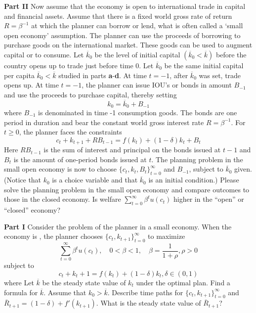 \medskip\noindent
{\bf Part  II}
\medskip \noindent
Now assume that the economy is open to international trade in capital and financial assets. Assume that there is a fixed world gross rate of return $R=\beta^{-1}$ at which the planner can borrow or lend, what is often called a `small open economy' assumption.
The planner can use the proceeds of borrowing to purchase goods on the international market. These goods can be used to augment capital or to consume.\medskip \noindent
Let $\overline{k}_0$ be the level of initial capital $(\overline{k}_0<\overline{k})$ before the country opens up to trade just before time 0.  Let $\overline{k}_0$ be the same initial capital per capita $\overline{k}_0 < \overline{k}$ studied in parts {\bf a}-{\bf d}.\medskip \noindent
At time $t=-1$, after $\overline{k}_0$ was set, trade opens up. At time $t=-1$, the planner can issue IOU's or bonds in amount $B_{-1}$ and use the proceeds to purchase capital, thereby setting
$$k_0=\overline{k}_0+B_{-1} $$
where $B_{-1}$ is denominated in time -1 consumption goods. The bonds are one period in duration and bear the constant world gross interest rate $R=\beta^{-1}$.
For $t\geq 0$, the planner faces the constraints
$$ c_t+k_{t+1}+RB_{t-1}=f(k_t)+(1-\delta)k_t+B_t$$
Here $RB_{t-1}$ is the sum of interest and  principal on the bonds issued at $t-1$ and $B_t$ is the amount of one-period bonds issued at $t$. \medskip \noindent
The planning problem in the small open economy is now to choose $\{c_t,k_{t},B_t\}_{t=0}^\infty$ and $B_{-1}$, subject to $\overline{k}_0$ given. (Notice that $k_0$ is a choice variable and that $\overline{k}_0$ is an initial condition.)
Please solve the  planning problem in the small open economy and compare outcomes to those in the closed economy.
 Is  welfare $\sum_{t=0}^\infty \beta^t u(c_t)$ higher in the ``open'' or ``closed'' economy?













\medskip
{}
 \medskip\noindent
{\bf Part  I}
\medskip \noindent
Consider the problem of the planner in a small economy. When the economy is , the planner chooses $\{c_t,k_{t+1}\}_{t=0}^\infty$ to maximize
$$ \sum_{t=0}^\infty \beta^t u(c_t), \quad  0< \beta<1, \quad  \beta = {{\frac{1}{1+\rho}}}, \rho>0$$
subject to
$$c_t+k_t+1=f(k_t)+(1-\delta)k_t,  \delta \in (0,1)$$
\noindent where%
\medskip
\noindent
Let $\overline{k}$ be the steady state value of $k_t$ under the optimal plan.
\medskip
{} Find a formula for $\overline{k}$.
\medskip
{} Assume that $k_0 > \overline{k}$. Describe time paths for $\{c_t,k_{t+1}\}_{t=0}^\infty$ and $\bar R_{t+1}=(1-\delta) + f'(k_{t+1})$.
\medskip
{} What is the steady state value of $\bar R_{t+1}$?\medskip

